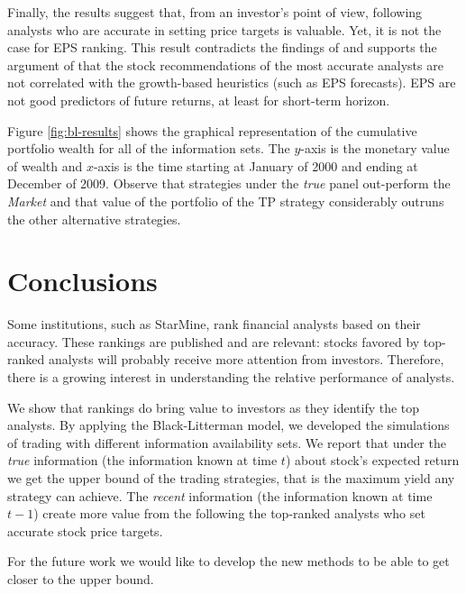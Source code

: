\documentclass{article}\usepackage[]{graphicx}\usepackage[]{color}
\newcommand{\tr}{\textit{true}}
\newcommand{\naive}{\textit{recent}}
\newcommand{\default}{\textit{all-time}}
\begin{document}
Finally, the results suggest that, from an investor's point of view, following analysts who are accurate in setting price targets is valuable. Yet, it is not the case for EPS ranking.  This result contradicts the findings of \cite{bradshaw2004} and supports the argument of \cite{simon2011} that the stock recommendations of the most accurate analysts are not correlated with the growth-based heuristics (such as EPS forecasts). EPS are not good predictors of future returns, at least for short-term horizon.

Figure \ref{fig:bl-results} shows the graphical representation of the cumulative portfolio wealth for all of the information sets. The $y$-axis is the monetary value of wealth and $x$-axis is the time starting at January of 2000 and ending at December of 2009. Observe that strategies under the \tr{} panel out-perform the \emph{Market} and that value of the portfolio of the TP strategy considerably outruns the other alternative strategies.

\section{Conclusions}
\label{sec:conclusion}

Some institutions, such as StarMine, rank financial analysts based on their accuracy. These rankings are published and are relevant: stocks favored by top-ranked analysts will probably receive more attention from investors. Therefore, there is a growing interest in understanding the relative performance of analysts.

We show that rankings do bring value to investors as they identify the top analysts. By applying the Black-Litterman model, we developed the simulations of trading with different information availability sets. We report that under the \tr{} information (the information known at time $t$) about stock's expected return we get the upper bound of the trading strategies, that is the maximum yield any strategy can achieve. The \naive{} information (the information known at time $t-1$) create more value from the following the top-ranked analysts who set accurate stock price targets. %

For the future work we would like to develop the new methods to be able to get closer to the upper bound.
\end{document}
